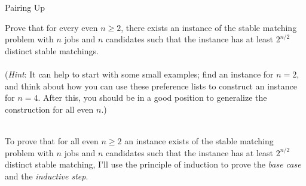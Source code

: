 \begin{homeworkProblem}{Pairing Up}

    Prove that for every even $n \geq 2$, there exists an instance of the stable matching problem with $n$ jobs and $n$ candidates such that the instance has at least $2^{n/2}$ distinct stable matchings.
    \\ \\
    (\textit{Hint}: It can help to start with some small examples; find an instance for $n=2$, and think about how you can use these preference lists to construct an instance for $n=4$. After this, you should be in a good position to generalize the construction for all even $n$.) 
    \\ \\
    \solution
    
    To prove that for all even $n \geq 2$ an instance exists of the stable matching problem with $n$ jobs and $n$ candidates such that the instance has at least $2^{n/2}$ distinct stable matching, I'll use the principle of induction to prove the \textit{base case} and the \textit{inductive step}.
    
\end{homeworkProblem}
